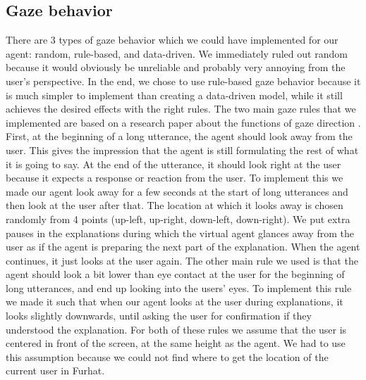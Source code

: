 \subsection{Gaze behavior}
There are 3 types of gaze behavior which we could have implemented for our agent: random, rule-based, and data-driven. We immediately ruled out random because it would obviously be unreliable and probably very annoying from the user's perspective. In the end, we chose to use rule-based gaze behavior because it is much simpler to implement than creating a data-driven model, while it still achieves the desired effects with the right rules.
\newline
\newline
The two main gaze rules that we implemented are based on a research paper about the functions of gaze direction \cite{kendon1967some}. First, at the beginning of a long utterance, the agent should look away from the user. This gives the impression that the agent is still formulating the rest of what it is going to say. At the end of the utterance, it should look right at the user because it expects a response or reaction from the user. To implement this we made our agent look away for a few seconds at the start of long utterances and then look at the user after that. The location at which it looks away is chosen randomly from 4 points (up-left, up-right, down-left, down-right). We put extra pauses in the explanations during which the virtual agent glances away from the user as if the agent is preparing the next part of the explanation. When the agent continues, it just looks at the user again.
\newline
\newline
The other main rule we used is that the agent should look a bit lower than eye contact at the user for the beginning of long utterances, and end up looking into the users' eyes. To implement this rule we made it such that when our agent looks at the user during explanations, it looks slightly downwards, until asking the user for confirmation if they understood the explanation. For both of these rules we assume that the user is centered in front of the screen, at the same height as the agent. We had to use this assumption because we could not find where to get the location of the current user in Furhat.
